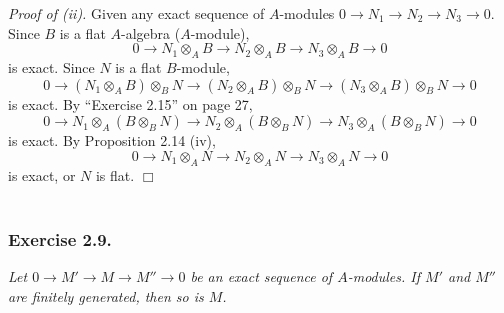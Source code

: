 \documentclass{article}
\begin{document}
\emph{Proof of (ii).}
Given any exact sequence of $A$-modules
$0 \to N_1 \to N_2 \to N_3 \to 0$.
Since $B$ is a flat $A$-algebra ($A$-module),
$$0 \to N_1 \otimes_{A} B \to N_2 \otimes_{A} B \to N_3 \otimes_{A} B \to 0$$
is exact.
Since $N$ is a flat $B$-module,
$$0 \to (N_1 \otimes_{A} B) \otimes_{B} N
\to (N_2 \otimes_{A} B) \otimes_{B} N
\to (N_3 \otimes_{A} B) \otimes_{B} N \to 0$$
is exact.
By ``Exercise 2.15'' on page 27,
$$0 \to N_1 \otimes_{A} (B \otimes_{B} N)
\to N_2 \otimes_{A} (B \otimes_{B} N)
\to N_3 \otimes_{A} (B \otimes_{B} N) \to 0$$
is exact.
By Proposition 2.14 (iv),
$$0 \to N_1 \otimes_{A} N
\to N_2 \otimes_{A} N
\to N_3 \otimes_{A} N \to 0$$
is exact,
or $N$ is flat.
$\Box$ \\\\






\subsubsection*{Exercise 2.9.}
\emph{Let $0 \to M' \to M \to M'' \to 0$ be an exact sequence of $A$-modules.
If $M'$ and $M''$ are finitely generated, then so is $M$.} \\
\end{document}
